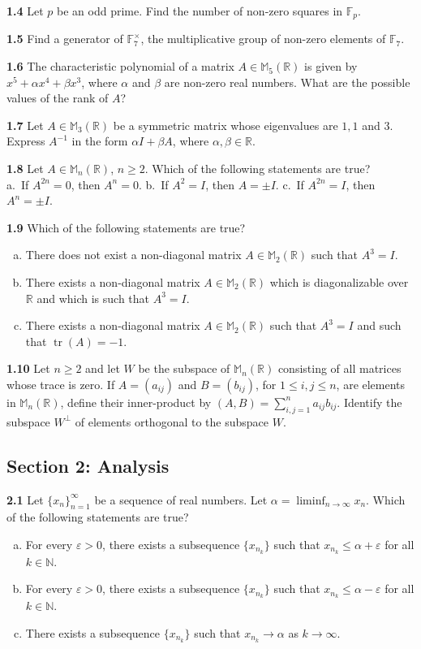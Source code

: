 \documentclass[11pt,a4paper]{article}
\newcommand{\N}{\mathbb{N}}
\newcommand{\R}{\mathbb{R}}
\newcommand{\F}{\mathbb{F}}
\newcommand{\M}{\mathbb{M}}
\newcommand{\tr}{\operatorname{tr}}
\newcommand{\examsec}[1]{%
  \subsection*{#1}
  \vspace{-2pt}
}
\newcommand{\qitem}[1]{\par\medskip\noindent\textbf{#1}\hspace{0.5em}}
\begin{document}
\qitem{1.4} Let $p$ be an odd prime. Find the number of non-zero squares in $\F_p$.

\qitem{1.5} Find a generator of $\F_7^\times$, the multiplicative group of non-zero elements of $\F_7$.

\qitem{1.6} The characteristic polynomial of a matrix $A \in \M_5(\R)$ is given by $x^5 + \alpha x^4 + \beta x^3$, where $\alpha$ and $\beta$ are non-zero real numbers. What are the possible values of the rank of $A$?

\qitem{1.7} Let $A \in \M_3(\R)$ be a symmetric matrix whose eigenvalues are $1, 1$ and $3$. Express $A^{-1}$ in the form $\alpha I + \beta A$, where $\alpha, \beta \in \R$.

\qitem{1.8} Let $A \in \M_n(\R)$, $n \ge 2$. Which of the following statements are true?\\
a.\ If $A^{2n} = 0$, then $A^n = 0$. \qquad b.\ If $A^2 = I$, then $A = \pm I$. \qquad c.\ If $A^{2n} = I$, then $A^n = \pm I$.

\qitem{1.9} Which of the following statements are true?
\begin{enumerate}[a.]
  \item There does not exist a non-diagonal matrix $A \in \M_2(\R)$ such that $A^3 = I$.
  \item There exists a non-diagonal matrix $A \in \M_2(\R)$ which is diagonalizable over $\R$ and which is such that $A^3 = I$.
  \item There exists a non-diagonal matrix $A \in \M_2(\R)$ such that $A^3 = I$ and such that $\tr(A) = -1$.
\end{enumerate}

\qitem{1.10} Let $n \ge 2$ and let $W$ be the subspace of $\M_n(\R)$ consisting of all matrices whose trace is zero. If $A = (a_{ij})$ and $B = (b_{ij})$, for $1 \le i, j \le n$, are elements in $\M_n(\R)$, define their inner-product by $(A, B) = \sum_{i,j=1}^{n} a_{ij} b_{ij}$. Identify the subspace $W^\perp$ of elements orthogonal to the subspace $W$.

\examsec{Section 2: Analysis}

\qitem{2.1} Let $\{x_n\}_{n=1}^{\infty}$ be a sequence of real numbers. Let $\alpha = \liminf_{n \to \infty} x_n$. Which of the following statements are true?
\begin{enumerate}[a.]
  \item For every $\varepsilon > 0$, there exists a subsequence $\{x_{n_k}\}$ such that $x_{n_k} \le \alpha + \varepsilon$ for all $k \in \N$.
  \item For every $\varepsilon > 0$, there exists a subsequence $\{x_{n_k}\}$ such that $x_{n_k} \le \alpha - \varepsilon$ for all $k \in \N$.
  \item There exists a subsequence $\{x_{n_k}\}$ such that $x_{n_k} \to \alpha$ as $k \to \infty$.
\end{enumerate}
\end{document}

